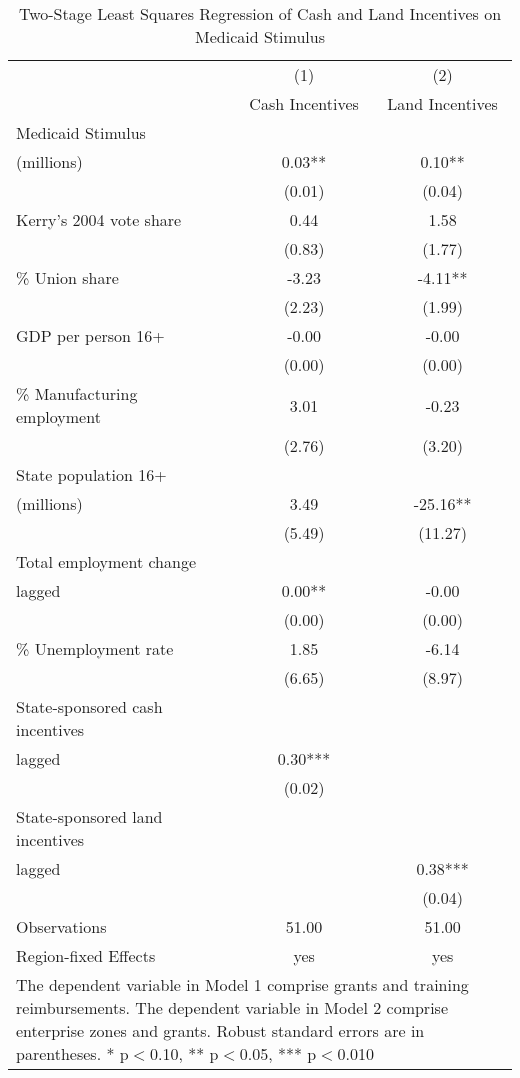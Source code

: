 \begin{table}[!htbp]\centering
\def\sym#1{\ifmmode^{#1}\else\(^{#1}\)\fi}
\caption{Two-Stage Least Squares Regression of Cash and Land Incentives on Medicaid Stimulus}
\begin{tabular}{l*{2}{c}}
\hline\hline
                    &\multicolumn{1}{c}{(1)}   &\multicolumn{1}{c}{(2)}   \\
                    &Cash Incentives   &Land Incentives   \\
\hline
Medicaid Stimulus \\ (millions)&        0.03** &        0.10** \\
                    &      (0.01)   &      (0.04)   \\
Kerry's 2004 vote share&        0.44   &        1.58   \\
                    &      (0.83)   &      (1.77)   \\
\% Union share      &       -3.23   &       -4.11** \\
                    &      (2.23)   &      (1.99)   \\
GDP per person 16+  &       -0.00   &       -0.00   \\
                    &      (0.00)   &      (0.00)   \\
\% Manufacturing employment&        3.01   &       -0.23   \\
                    &      (2.76)   &      (3.20)   \\
 State population 16+ \\ (millions)&        3.49   &      -25.16** \\
                    &      (5.49)   &     (11.27)   \\
Total employment change \\ lagged&        0.00** &       -0.00   \\
                    &      (0.00)   &      (0.00)   \\
\% Unemployment rate&        1.85   &       -6.14   \\
                    &      (6.65)   &      (8.97)   \\
State-sponsored cash incentives \\ lagged&        0.30***&               \\
                    &      (0.02)   &               \\
State-sponsored land incentives \\ lagged&               &        0.38***\\
                    &               &      (0.04)   \\
\hline
Observations        &       51.00   &       51.00   \\
Region-fixed Effects&         yes   &         yes   \\
\hline\hline
\multicolumn{3}{p{0.75\linewidth}}{\footnotesize The dependent variable in Model 1 comprise grants and training reimbursements. The dependent variable in Model 2 comprise enterprise zones and grants. Robust standard errors are in parentheses. * p$<$0.10, ** p$<$0.05, *** p$<$0.010}\\
\end{tabular}
\end{table}
